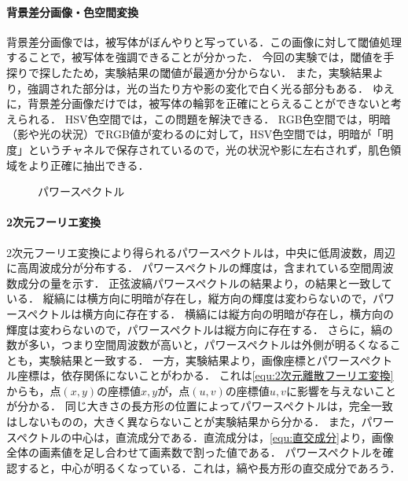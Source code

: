 \paragraph{背景差分画像・色空間変換}
背景差分画像では，被写体がぼんやりと写っている．この画像に対して閾値処理することで，被写体を強調できることが分かった．
今回の実験では，閾値を手探りで探したため，実験結果の閾値が最適か分からない．
また，実験結果より，強調された部分は，光の当たり方や影の変化で白く光る部分もある．
ゆえに，背景差分画像だけでは，被写体の輪郭を正確にとらえることができないと考えられる．
HSV色空間では，この問題を解決できる．
RGB色空間では，明暗（影や光の状況）でRGB値が変わるのに対して，HSV色空間では，明暗が「明度」というチャネルで保存されているので，光の状況や影に左右されず，肌色領域をより正確に抽出できる．
\begin{wrapfigure}{r}[0mm]{.3\textwidth}
    \centering
    \caption{パワースペクトル}
    \label{fig:パワースペクトル}
    \vspace{-.5cm}
\end{wrapfigure}
\paragraph{2次元フーリエ変換}
2次元フーリエ変換により得られるパワースペクトルは，中央に低周波数，周辺に高周波成分が分布する．
パワースペクトルの輝度は，含まれている空間周波数成分の量を示す．
正弦波縞パワースペクトルの結果より，の結果と一致している．
縦縞には横方向に明暗が存在し，縦方向の輝度は変わらないので，パワースペクトルは横方向に存在する．
横縞には縦方向の明暗が存在し，横方向の輝度は変わらないので，パワースペクトルは縦方向に存在する．
さらに，縞の数が多い，つまり空間周波数が高いと，パワースペクトルは外側が明るくなることも，実験結果と一致する．
一方，実験結果より，画像座標とパワースペクトル座標は，依存関係にないことがわかる．
これは\eqref{equ:2次元離散フーリエ変換}からも，点\((x,y)\)の座標値\(x,y\)が，点\((u,v)\)の座標値\(u,v\)に影響を与えないことが分かる．
同じ大きさの長方形の位置によってパワースペクトルは，完全一致はしないものの，大きく異ならないことが実験結果から分かる．
また，パワースペクトルの中心は，直流成分である．直流成分は，\eqref{equ:直交成分}より，画像全体の画素値を足し合わせて画素数で割った値である．
パワースペクトルを確認すると，中心が明るくなっている．これは，縞や長方形の直交成分であろう．
